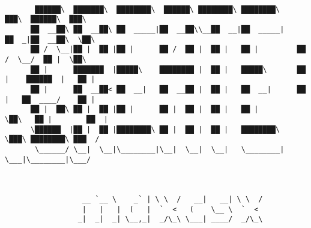 \documentclass[varwidth=\maxdimen,margin=0.5cm,multi={verbatim}]{standalone}
\begin{document}
\begin{verbatim}

       ██████\  ███████\  ████████\  ██████\ ████████\ ████████\      ███\  ██████\  ███\
      ██  __██\ ██  __██\ ██  _____|██  __██\\__██  __|██  _____|    ██  _|██  __██\  \██\
      ██ /  \__|██ |  ██ |██ |      ██ /  ██ |  ██ |   ██ |         ██  /  \__/  ██ |  \██\
      ██ |      ███████  |█████\    ████████ |  ██ |   █████\       ██ |    ██████  |   ██ |
      ██ |      ██  __██< ██  __|   ██  __██ |  ██ |   ██  __|      ██ |   ██  ____/    ██ |
      ██ |  ██\ ██ |  ██ |██ |      ██ |  ██ |  ██ |   ██ |         \██\   ██ |        ██  |
      \██████  |██ |  ██ |████████\ ██ |  ██ |  ██ |   ████████\     \███\ ████████\ ███  /
       \______/ \__|  \__|\________|\__|  \__|  \__|   \________|      \___|\________|\___/



                  __ `__ \    _` | \ \  /   __|   __| \ \  /
                  |   |   |  (   |  `  <   (    \__ \  `  <
                 _|  _|  _| \__,_|  _/\_\ \___| ____/  _/\_\



\end{verbatim}
\end{document}
